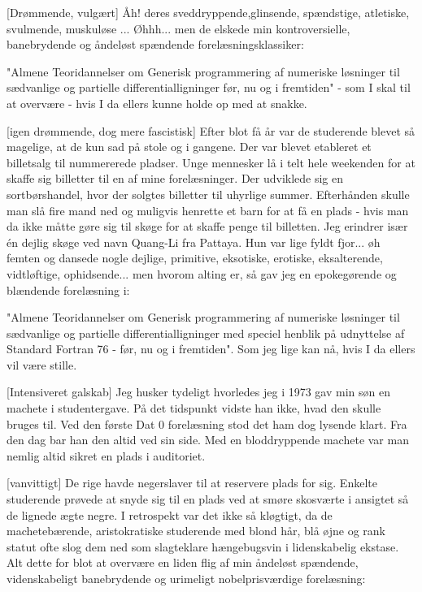 \documentclass[a4paper,11pt]{article}
\begin{document}
\begin{sketch}
[Drømmende, vulgært] Åh! deres sveddryppende,glinsende,
spændstige, atletiske, svulmende, muskuløse ... Øhhh... men de elskede
min kontroversielle, banebrydende og åndeløst spændende
forelæsningsklassiker:  

 "Almene Teoridannelser om Generisk programmering af numeriske
løsninger til sædvanlige og partielle differentialligninger før, nu og
i fremtiden" - som I skal til at overvære - hvis I da ellers kunne holde op
  med at snakke. 
 
[igen drømmende, dog mere fascistisk] Efter blot få år var de
  studerende blevet så magelige, at de kun sad på stole og i gangene. Der var
  blevet etableret et billetsalg til nummererede pladser. Unge mennesker lå i telt hele weekenden for at skaffe sig
  billetter til en af mine forelæsninger. Der udviklede sig en sortbørshandel, hvor der
  solgtes billetter til uhyrlige summer. Efterhånden skulle man slå
  fire mand ned og muligvis henrette et barn for at få en plads -
  hvis man da ikke måtte gøre sig til skøge for at skaffe penge til billetten.
   Jeg erindrer især én dejlig skøge ved
  navn Quang-Li fra Pattaya. Hun var lige fyldt fjor... øh femten og
  dansede nogle dejlige, primitive, eksotiske, erotiske, eksalterende,
  vidtløftige, ophidsende...  men hvorom alting
  er, så gav jeg en epokegørende og blændende forelæsning i: 
 
"Almene Teoridannelser om Generisk programmering af numeriske
  løsninger til sædvanlige og partielle differentialligninger med
  speciel henblik på udnyttelse af Standard Fortran 76 - før, nu og
  i fremtiden". Som jeg lige kan nå, hvis I da ellers vil være
  stille.

[Intensiveret galskab] Jeg husker tydeligt hvorledes
  jeg i 1973 gav min søn en machete i studentergave. På det tidspunkt vidste han ikke, hvad den
  skulle bruges til. Ved den første Dat 0 forelæsning stod det ham dog
  lysende klart. Fra den dag bar han den altid ved sin side. Med en
  bloddryppende machete var man nemlig altid sikret en
  plads i auditoriet. 

[vanvittigt] De rige havde negerslaver til at reservere plads
  for sig. Enkelte studerende prøvede at snyde sig til en plads
  ved at smøre skosværte i ansigtet så de lignede ægte negre. I
  retrospekt var det ikke så kløgtigt, da de machetebærende, aristokratiske
  studerende med blond hår, blå øjne og rank statut  ofte slog dem
  ned som slagteklare hængebugsvin i lidenskabelig ekstase. 
  Alt dette for blot at overvære en liden flig af
  min åndeløst spændende, videnskabeligt banebrydende og urimeligt
  nobelprisværdige forelæsning: 
 

\end{sketch}
\end{document}
